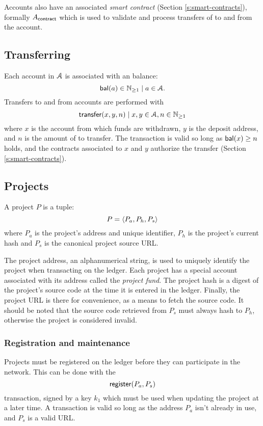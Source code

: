 Accounts also have an associated \emph{smart contract} (Section
\ref{s:smart-contracts}), formally $A_{\mathsf{contract}}$ which is used to
validate and process transfers of \oscoin{} to and from the account.

\subsection{Transferring \oscoin{}}
\label{s:transfering}

Each account in $\mathcal{A}$ is associated with an \oscoin{} balance:
\[
    \mathsf{bal}(a) \in \mathbb{N}_{\geq 1} \mid a \in \mathcal{A}.
\]
Transfers to and from accounts are performed with
\[
    \mathsf{transfer}\lparen x,y,n\rparen \mid x,y \in \mathcal{A}, n \in \mathbb{N}_{\geq 1}
\]
where $x$ is the account from which funds are withdrawn, $y$ is the deposit
address, and $n$ is the amount of \oscoin{} to transfer.  The transaction is
valid so long as $\mathsf{bal}(x) \geq n$ holds, and the contracts associated to $x$ and
$y$ authorize the transfer (Section \ref{s:smart-contracts}).

\subsection{Projects}
\label{s:projects}


A project $P$ is a tuple:
\[
    P = \langle P_a, P_h, P_s\rangle
\]
where $P_{a}$ is the project's address and unique identifier, $P_h$ is
the project's current hash and $P_s$ is the canonical project source
URL.

The project address, an alphanumerical string, is used to uniquely identify the
project when transacting on the ledger. Each project has a special account
associated with its address called the \emph{project fund}. The project hash is
a digest of the project's source code at the time it is entered in the ledger.
Finally, the project URL is there for convenience, as a means to fetch the
source code. It should be noted that the source code retrieved from $P_s$ must
always hash to $P_h$, otherwise the project is considered invalid.

\subsubsection{Registration and maintenance} Projects must be
registered on the ledger before they can participate in the
network. This can be done with the
\[
    \mathsf{register}\lparen P_a, P_s\rparen
\]
transaction, signed by a key $k_1$ which must be used when updating the project
at a later time. A transaction is valid so long as the address $P_a$ isn't
already in use, and $P_s$ is a valid URL.

